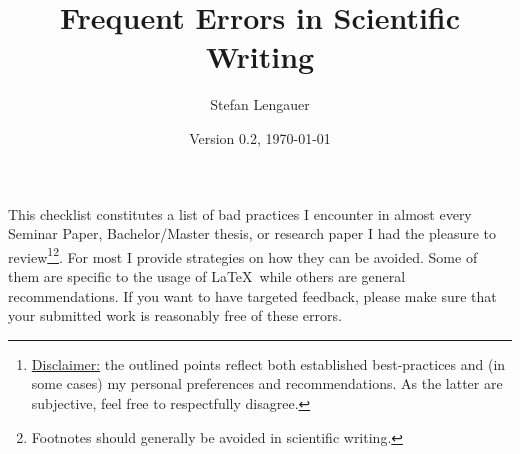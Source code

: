 \documentclass[10pt, a4paper]{article}
\title{Frequent Errors in Scientific Writing}
\author{Stefan Lengauer}
\date{Version 0.2, \today}
\begin{document}
\maketitle


\noindent This checklist constitutes a list of bad practices I encounter in almost every Seminar Paper, Bachelor/Master thesis, or research paper I had the pleasure to review\footnote{
\uline{Disclaimer:} the outlined points reflect both established best-practices and (in some cases) my personal preferences and recommendations. As the latter are subjective, feel free to respectfully disagree.}\footnote{Footnotes should generally be avoided in scientific writing.}. 
For most I provide strategies on how they can be avoided. 
Some of them are specific to the usage of \LaTeX\ while others are general recommendations. 
%
%
If you want to have targeted feedback, please make sure that your submitted work is reasonably free of these errors. 
\end{document}
